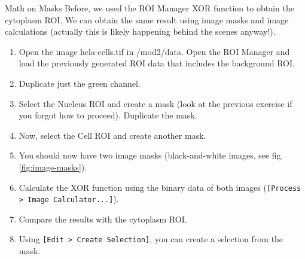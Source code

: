 \begin{taskbox}{Math on Masks}
Before, we used the ROI Manager XOR function to obtain the cytoplasm ROI. We can obtain the same result using image masks and image calculations (actually this is likely happening behind the scenes anyway!).

\begin{enumerate}
	\item Open the image hela-cells.tif in /mod2/data. Open the ROI Manager and load the previously generated ROI data that includes the background ROI.
	\item Duplicate just the green channel.
	\item Select the Nucleus ROI and create a mask (look at the previous exercise if you forgot how to proceed). Duplicate the mask.
	\item Now, select the Cell ROI and create another mask.
	\item You should now have two image masks (black-and-white images, see fig. \ref{fig:image-masks}).	
	
		\begin{minipage}[t]{\linewidth}
		\begin{center}
		\medskip
		\label{fig:image-masks}
		\end{center}
	\end{minipage}
	
	\item Calculate the XOR function using the binary data of both images (\texttt{[Process > Image Calculator...]}).
	\item Compare the results with the cytoplasm ROI.
	\item Using \texttt{[Edit > Create Selection]}, you can create a selection from the mask.
\end{enumerate}

\end{taskbox}

